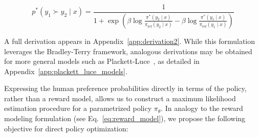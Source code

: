 \begin{equation}\label{eq:objective}
    p^*(y_1\succ y_2 \mid x)=\frac{1}{1 + \exp\left(\beta \log \frac{\pi^*(y_2\mid x)}{\pi_\text{ref}(y_2\mid x)} - \beta \log \frac{\pi^*(y_1\mid x)}{\pi_\text{ref}(y_1\mid x)}\right)}
\end{equation}

A full derivation appears in Appendix~\ref{app:derivation2}. While this formulation leverages the Bradley-Terry framework, analogous derivations may be obtained for more general models such as Plackett-Luce~\citep{plackett1975analysis, luce2012individual}, as detailed in Appendix~\ref{app:plackett_luce_models}.

Expressing the human preference probabilities directly in terms of the policy, rather than a reward model, allows us to construct a maximum likelihood estimation procedure for a parametrized policy $\pi_\theta$. In analogy to the reward modeling formulation (see Eq.~\ref{eq:reward_model}), we propose the following objective for direct policy optimization:

